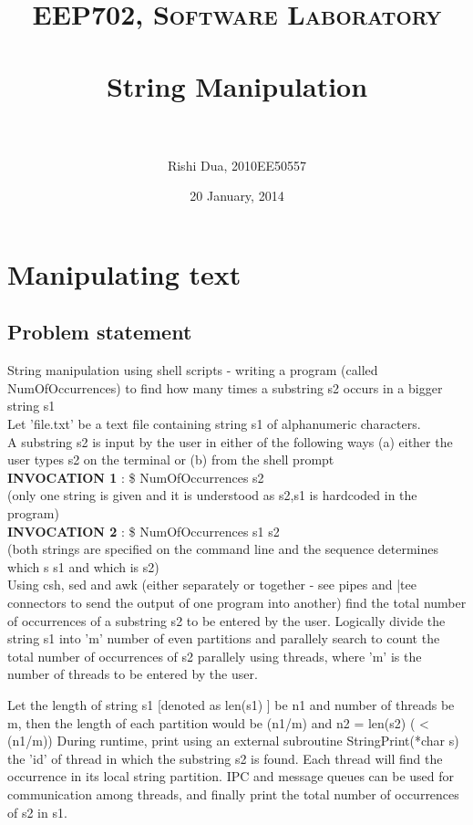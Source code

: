 \documentclass[paper=a4, fontsize=11pt]{scrartcl} %
\title{	
\normalfont \normalsize 
\textsc{EEP702, Software Laboratory} \\ [25pt] %
\horrule{0.5pt} \\[0.4cm] %
\huge String Manipulation \\ %
\horrule{2pt} \\[0.5cm] %
}
\author{Rishi Dua, 2010EE50557} %
\date{\normalsize 20 January, 2014} %
\numberwithin{equation}{section} %
\numberwithin{figure}{section} %
\numberwithin{table}{section} %
\begin{document}
\maketitle %


\section{Manipulating text}


\subsection{Problem statement}
String manipulation using shell scripts - writing a program (called NumOfOccurrences) to find how many times a substring s2 occurs in a bigger string s1\\

Let 'file.txt' be a text file containing string s1 of alphanumeric characters.\\

A substring s2 is input by the user in either of the following ways (a) either the user types s2 on the terminal or (b) from the shell prompt\\

\textbf{INVOCATION 1} : \$ NumOfOccurrences s2\\
(only one string is given and it is understood as s2,s1 is hardcoded in the program)\\
\textbf{INVOCATION 2 }: \$ NumOfOccurrences s1 s2\\
(both strings are specified on the command line and the sequence determines which s s1 and which is s2)\\

Using csh, sed and awk (either separately or together - see pipes and |tee connectors to send the output of one program into another)  
find the total number of occurrences of a substring s2 to be entered by the user. Logically divide the string s1 into 'm' number of even partitions and parallely search to count the total number of occurrences of s2 parallely using threads, where 'm' is the number of threads to be entered by the user.

Let the length of string s1 [denoted as len(s1) ] be n1 and number of threads be m, then the length of each partition would be (n1/m) and n2 = len(s2) ( < (n1/m)) During runtime, print using an external subroutine StringPrint(*char s) the 'id' of thread in which the substring s2 is found. Each thread will find the occurrence in its local string partition. IPC and message queues can be used for communication among threads, and finally print the total number of occurrences of s2 in s1.
\end{document}
